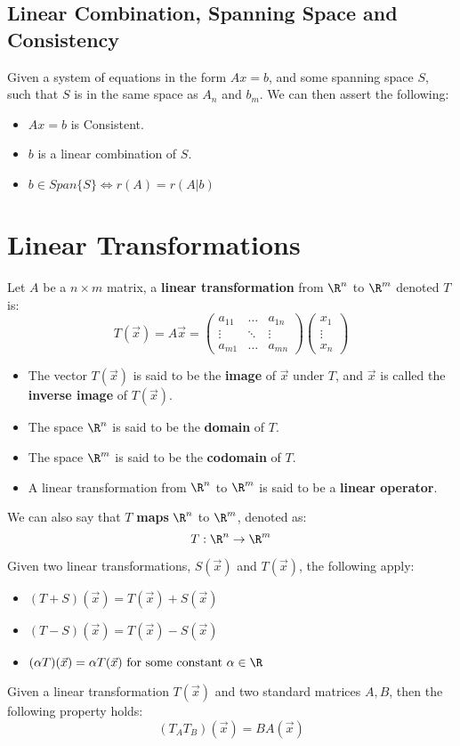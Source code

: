 \documentclass[a4paper]{article}
\begin{document}
  \subsection{Linear Combination, Spanning Space and Consistency}
  Given a system of equations in the form $Ax = b$, and some spanning space $S$, such that $S$ is in the same space as $A_n$ and $b_m$. We can then assert the following:
  \begin{itemize}
    \item $Ax = b$ is Consistent.
    \item $b$ is a linear combination of $S$.
    \item $b \in Span\{S\} \Leftrightarrow r(A) = r(A|b)$
  \end{itemize}
  \section{Linear Transformations} 
  Let $A$ be a $n\times m$ matrix, a \textbf{linear transformation} from $\R^n$ to $\R^m$ denoted $T$ is:
  \[
    T(\vec{x})= A\vec{x} = 
    \begin{pmatrix}
      a_{11} & \dots & a_{1n} \\
      \vdots & \ddots & \vdots \\
      a_{m1} & \dots & a_{mn}
    \end{pmatrix}
    \begin{pmatrix}
     x_1 \\
     \vdots \\
     x_n
    \end{pmatrix}
  \]
  \begin{itemize}
    \item The vector $T(\vec{x})$ is said to be the \textbf{image} of $\vec{x}$ under $T$, and $\vec{x}$ is called the \textbf{inverse image} of $T(\vec{x})$. 
    \item The space $\R^n$ is said to be the \textbf{domain} of $T$.
    \item The space $\R^m$ is said to be the \textbf{codomain} of $T$.
    \item A linear transformation from $\R^n$ to $\R^m$ is said to be a \textbf{linear operator}.
  \end{itemize}
  We can also say that $T$ \textbf{maps} $\R^n$ to $\R^m$, denoted as:
  \[
    T: \R^n \rightarrow \R^m
  \]
  \newpage

  \noindent Given two linear transformations, $S(\vec{x})$ and $T(\vec{x})$, the following apply:
  \begin{itemize}
    \item $(T+S)(\vec{x}) = T(\vec{x}) + S(\vec{x})$
    \item $(T-S)(\vec{x}) = T(\vec{x}) - S(\vec{x})$
    \item $(\alpha T)(\vec{x}) = \alpha T(\vec{x}) \textrm{ for some constant } \alpha \in \R$
  \end{itemize}
  Given a linear transformation $T(\vec{x})$ and two standard matrices $A,B$, then the following property holds:
  \[
    (T_A T_B)(\vec{x}) = BA(\vec{x})
  \]
\end{document}
